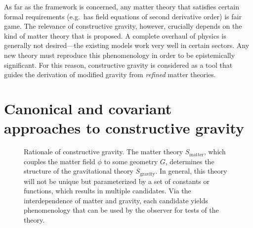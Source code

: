 As far as the framework is concerned, any matter theory that satisfies certain formal requirements (e.g.\ has field equations of second derivative order) is fair game. The relevance of constructive gravity, however, crucially depends on the kind of matter theory that is proposed. A complete overhaul of physics is generally not desired---the existing models work very well in certain sectors. Any new theory must reproduce this phenomenology in order to be epistemically significant. For this reason, constructive gravity is considered as a tool that guides the derivation of modified gravity from \emph{refined} matter theories.

\section{Canonical and covariant approaches to constructive gravity}\label{section_intro_ccg}
\begin{figure}
  \begin{center}
  \end{center}
  \caption{Rationale of constructive gravity. The matter theory $S_\text{matter}$, which couples the matter field $\phi$ to some geometry $G$, determines the structure of the gravitational theory $S_\text{gravity}$. In general, this theory will not be unique but parameterized by a set of constants or functions, which results in multiple candidates. Via the interdependence of matter and gravity, each candidate yields phenomenology that can be used by the observer for tests of the theory.}
  \label{figure_matter_gravity}
\end{figure}
